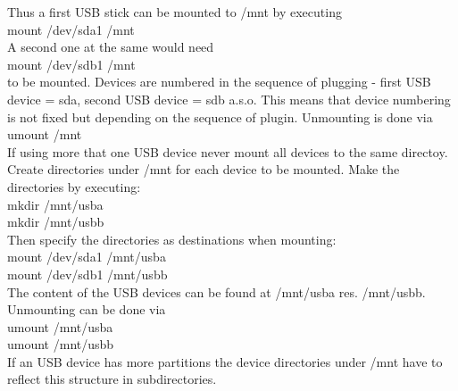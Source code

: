 Thus a first USB stick can be mounted to /mnt by executing\\

mount /dev/sda1 /mnt\\

A second one at the same would need \\

mount /dev/sdb1 /mnt\\

to be mounted. Devices are numbered in the sequence of plugging - first USB 
device = sda, second USB device = sdb a.s.o. This means that device numbering 
is not fixed but depending on the sequence of plugin. Unmounting is done via \\

umount /mnt\\

If using more that one USB device never mount all devices to the same directoy. 
Create directories under /mnt for each device to be mounted. Make the directories 
by executing:\\

mkdir /mnt/usba\\
mkdir /mnt/usbb\\

Then specify the directories as destinations when mounting:\\

mount /dev/sda1 /mnt/usba\\
mount /dev/sdb1 /mnt/usbb\\

The content of the USB devices can be found at /mnt/usba res. /mnt/usbb.
Unmounting can be done via \\

umount /mnt/usba\\
umount /mnt/usbb\\

If an USB device has more partitions the device directories under /mnt have 
to reflect this structure in subdirectories.
